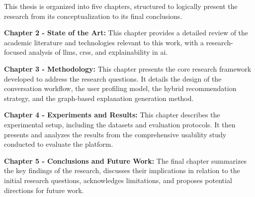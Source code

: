 This thesis is organized into five chapters, structured to logically present the research from its conceptualization to its final conclusions.

\begin{compactitem}[\textbullet]
    \item \textbf{Chapter 2 - State of the Art:} This chapter provides a detailed review of the academic literature and technologies relevant to this work, with a research-focused analysis of \acp{llm}, \acp{crs}, and explainability in \ac{ai}.
    \item \textbf{Chapter 3 - Methodology:} This chapter presents the core research framework developed to address the research questions. It details the design of the conversation workflow, the user profiling model, the hybrid recommendation strategy, and the graph-based explanation generation method.
    \item \textbf{Chapter 4 - Experiments and Results:} This chapter describes the experimental setup, including the datasets and evaluation protocols. It then presents and analyzes the results from the comprehensive usability study conducted to evaluate the platform.
    \item \textbf{Chapter 5 - Conclusions and Future Work:} The final chapter summarizes the key findings of the research, discusses their implications in relation to the initial research questions, acknowledges limitations, and proposes potential directions for future work.
\end{compactitem}